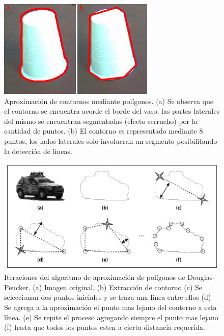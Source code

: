 \begin{figure}[htpb]
\begin{center}
  \includegraphics[scale=0.8]{figuras/polyaprox.png}
\end{center}
  \caption{\small Aproximación de contornos mediante polígonos. (a) Se observa que el contorno se encuentra acorde el borde del vaso, las
  partes laterales del mismo se encuentran segmentadas (efecto serrucho) por la cantidad de puntos. (b) El contorno es representado mediante
  8 puntos, los lados laterales solo involucran un segmento posibilitando la detección de lineas.}
  \label{fig:polyVasos}
\end{figure}

\begin{figure}[htpb]
\begin{center}
  \includegraphics[scale=0.6]{figuras/douglas-pecker.png}
\end{center}
  \caption{\small Iteraciones del algoritmo de aproximación de polígonos de Douglas-Peucker. (a) Imagen original. (b) Extracción de contorno
  (c) Se seleccionan dos puntos iniciales y se traza una línea entre ellos (d) Se agrega a la aproximación el punto mas lejano del contorno a esta línea.
  (e) Se repite el proceso agregando siempre el punto mas lejano (f) hasta que todos los puntos esten a cierta distancia requerida.}
  \label{fig:polyaprox}
\end{figure}

